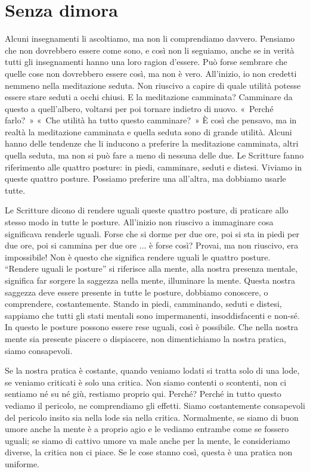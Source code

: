 \chapter{Senza dimora}

Alcuni insegnamenti li ascoltiamo, ma non li comprendiamo davvero.
Pensiamo che non dovrebbero essere come sono, e così non li seguiamo,
anche se in verità tutti gli insegnamenti hanno una loro ragion
d'essere. Può forse sembrare che quelle cose non dovrebbero essere così,
ma non è vero. All'inizio, io non credetti nemmeno nella meditazione
seduta. Non riuscivo a capire di quale utilità potesse essere stare
seduti a occhi chiusi. E la meditazione camminata? Camminare da questo a
quell'albero, voltarsi per poi tornare indietro di nuovo. «~Perché
farlo?~» «~Che utilità ha tutto questo camminare?~» È così che pensavo,
ma in realtà la meditazione camminata e quella seduta sono di grande
utilità. Alcuni hanno delle tendenze che li inducono a preferire la
meditazione camminata, altri quella seduta, ma non si può fare a meno di
nessuna delle due. Le Scritture fanno riferimento alle quattro posture:
in piedi, camminare, seduti e distesi. Viviamo in queste quattro
posture. Possiamo preferire una all'altra, ma dobbiamo usarle tutte.

Le Scritture dicono di rendere uguali queste quattro posture, di
praticare allo stesso modo in tutte le posture. All'inizio non riuscivo
a immaginare cosa significava renderle uguali. Forse che si dorme per
due ore, poi si sta in piedi per due ore, poi si cammina per due ore ...
è forse così? Provai, ma non riuscivo, era impossibile! Non è questo che
significa rendere uguali le quattro posture. ``Rendere uguali le
posture'' si riferisce alla mente, alla nostra presenza mentale,
significa far sorgere la saggezza nella mente, illuminare la mente.
Questa nostra saggezza deve essere presente in tutte le posture,
dobbiamo conoscere, o comprendere, costantemente. Stando in piedi,
camminando, seduti e distesi, sappiamo che tutti gli stati mentali sono
impermanenti, insoddisfacenti e non-sé. In questo le posture possono
essere rese uguali, così è possibile. Che nella nostra mente sia
presente piacere o dispiacere, non dimentichiamo la nostra pratica,
siamo consapevoli.

Se la nostra pratica è costante, quando veniamo lodati si tratta solo di
una lode, se veniamo criticati è solo una critica. Non siamo contenti o
scontenti, non ci sentiamo né su né giù, restiamo proprio qui. Perché?
Perché in tutto questo vediamo il pericolo, ne comprendiamo gli effetti.
Siamo costantemente consapevoli del pericolo insito sia nella lode sia
nella critica. Normalmente, se siamo di buon umore anche la mente è a
proprio agio e le vediamo entrambe come se fossero uguali; se siamo di
cattivo umore va male anche per la mente, le consideriamo diverse, la
critica non ci piace. Se le cose stanno così, questa è una pratica non
uniforme.

